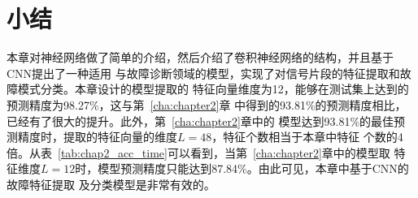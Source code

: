 \section{小结}

本章对神经网络做了简单的介绍，然后介绍了卷积神经网络的结构，并且基于CNN提出了一种适用
与故障诊断领域的模型，实现了对信号片段的特征提取和故障模式分类。本章设计的模型提取的
特征向量维度为12，能够在测试集上达到的预测精度为98.27\%，这与第~\ref{cha:chapter2}章
中得到的93.81\%的预测精度相比，已经有了很大的提升。此外，第~\ref{cha:chapter2}章中的
模型达到93.81\%的最佳预测精度时，提取的特征向量的维度$L=48$，特征个数相当于本章中特征
个数的4倍。从表~\ref{tab:chap2_acc_time}可以看到，当第~\ref{cha:chapter2}章中的模型取
特征维度$L=12$时，模型预测精度只能达到87.84\%。由此可见，本章中基于CNN的故障特征提取
及分类模型是非常有效的。
